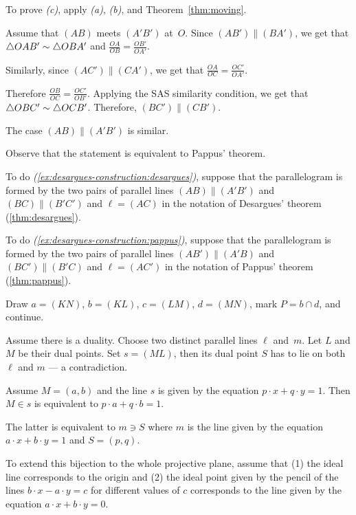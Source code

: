 To prove \textit{(c)}, apply \textit{(a)}, \textit{(b)}, and Theorem~\ref{thm:moving}.

Assume that $(AB)$ meets $(A'B')$ at~$O$.
Since $(AB')\parallel (BA')$, we get that $\triangle OAB'\z\sim\triangle OBA'$
and
$\frac{OA}{OB}=\frac{OB'}{OA'}$.

Similarly, since $(AC')\parallel (CA')$, we get that
$\frac{OA}{OC}=\frac{OC'}{OA'}$.

Therefore
$\frac{OB}{OC}=\frac{OC'}{OB'}$.
Applying the SAS similarity condition, we get that
$\triangle OBC'\z\sim\triangle OCB'$.
Therefore, $(BC')\parallel (CB')$.

The case $(AB)\parallel(A'B')$ is similar.

 Observe that the statement is equivalent to Pappus' theorem.

To do \textit{(\ref{ex:desargues-construction:desargues})}, 
suppose that the parallelogram is formed by the two pairs of parallel lines $(AB)\parallel (A'B')$ and $(BC)\parallel(B'C')$ and $\ell=(AC)$ in the notation of Desargues' theorem (\ref{thm:desargues}).

To do \textit{(\ref{ex:desargues-construction:pappus})}, suppose that the parallelogram is formed by the two pairs of parallel lines $(AB')\parallel (A'B)$ and $(BC')\parallel(B'C)$ and $\ell=(AC')$ in the notation of Pappus' theorem (\ref{thm:pappus}).

Draw $a=(KN)$, $b=(KL)$, $c=(LM)$, $d=(MN)$, mark $P=b\cap d$, and continue. 

Assume there is a duality.
Choose two distinct parallel lines $\ell$ and~$m$.
Let $L$ and $M$ be their dual points.
Set $s=(ML)$, then its dual point $S$ has to lie on both $\ell$ and $m$ --- a contradiction.

Assume $M=(a,b)$ 
and the line $s$ is given by the equation $p\cdot x+q\cdot y=1$.
Then $M\in s$ is equivalent to $p\cdot a+q\cdot b=1$.

The latter is equivalent to $m\ni S$
where $m$ is the line given by the equation 
$a\cdot x+b\cdot y=1$ and $S=(p,q)$.

To extend this bijection to the whole projective plane, assume that 
(1) the ideal line corresponds to the origin 
and (2) the ideal point given by the pencil of the lines $b\cdot x-a\cdot y=c$ for different values of $c$ corresponds to the line given by the equation $a\cdot x+b\cdot y=0$.

